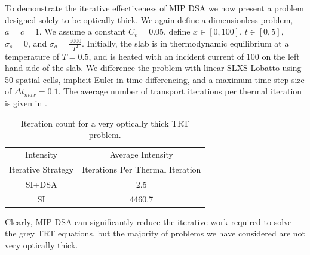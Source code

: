 To demonstrate the iterative effectiveness of MIP DSA we now present a problem designed solely to be optically thick.
We again define a dimensionless problem, $a=c=1$.
We assume a constant $C_v = 0.05$, define $x\in[0,100]$, $t\in[0,5]$, $\sigma_s = 0$, and $\sigma_a = \frac{5000}{T^2}$.
Initially, the slab is in thermodynamic equilibrium at a temperature of $T=0.5$, and is heated with an incident current of $100$ on the left hand side of the slab.
We difference the problem with linear SLXS Lobatto using 50 spatial cells, implicit Euler in time differencing, and a maximum time step size of $\Delta t_{max} = 0.1$.
The average number of transport iterations per thermal iteration is given in .
\begin{table}[!ht]
\centering
\caption{Iteration count for a very optically thick TRT problem.}
\label{tbl:high_iter_count}
\begin{tabular}{|c|c|}
\hline
Intensity  						& Average Intensity					\\				
Iterative Strategy		& Iterations Per Thermal Iteration \\
\hline
SI+DSA				&   2.5  \\ 
\hline
SI  &   4460.7 \\
\hline
\end{tabular}
\end{table}
Clearly, MIP DSA can significantly reduce the iterative work required to solve the grey TRT equations, but the majority of problems we have considered are not very optically thick.

